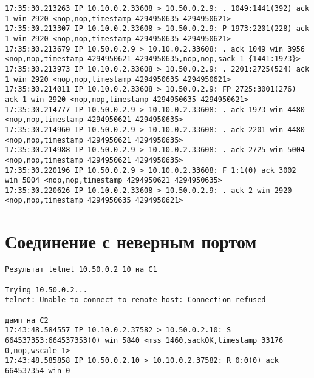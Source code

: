 \documentclass[a4paper,12pt]{article}
\begin{document}
\begin{Verbatim}
17:35:30.213263 IP 10.10.0.2.33608 > 10.50.0.2.9: . 1049:1441(392) ack 1 win 2920 <nop,nop,timestamp 4294950635 4294950621>
17:35:30.213307 IP 10.10.0.2.33608 > 10.50.0.2.9: P 1973:2201(228) ack 1 win 2920 <nop,nop,timestamp 4294950635 4294950621>
17:35:30.213679 IP 10.50.0.2.9 > 10.10.0.2.33608: . ack 1049 win 3956 <nop,nop,timestamp 4294950621 4294950635,nop,nop,sack 1 {1441:1973}>
17:35:30.213973 IP 10.10.0.2.33608 > 10.50.0.2.9: . 2201:2725(524) ack 1 win 2920 <nop,nop,timestamp 4294950635 4294950621>
17:35:30.214011 IP 10.10.0.2.33608 > 10.50.0.2.9: FP 2725:3001(276) ack 1 win 2920 <nop,nop,timestamp 4294950635 4294950621>
17:35:30.214777 IP 10.50.0.2.9 > 10.10.0.2.33608: . ack 1973 win 4480 <nop,nop,timestamp 4294950621 4294950635>
17:35:30.214960 IP 10.50.0.2.9 > 10.10.0.2.33608: . ack 2201 win 4480 <nop,nop,timestamp 4294950621 4294950635>
17:35:30.214988 IP 10.50.0.2.9 > 10.10.0.2.33608: . ack 2725 win 5004 <nop,nop,timestamp 4294950621 4294950635>
17:35:30.220196 IP 10.50.0.2.9 > 10.10.0.2.33608: F 1:1(0) ack 3002 win 5004 <nop,nop,timestamp 4294950621 4294950635>
17:35:30.220626 IP 10.10.0.2.33608 > 10.50.0.2.9: . ack 2 win 2920 <nop,nop,timestamp 4294950635 4294950621>
\end{Verbatim}

\section{Соединение с неверным портом}

\begin{Verbatim}
Результат telnet 10.50.0.2 10 на C1

Trying 10.50.0.2...
telnet: Unable to connect to remote host: Connection refused

дамп на C2
17:43:48.584557 IP 10.10.0.2.37582 > 10.50.0.2.10: S 664537353:664537353(0) win 5840 <mss 1460,sackOK,timestamp 33176 0,nop,wscale 1>
17:43:48.585858 IP 10.50.0.2.10 > 10.10.0.2.37582: R 0:0(0) ack 664537354 win 0
\end{Verbatim}
\end{document}
